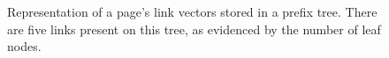 \begin{figure}[tb]
  \centering
  \resizebox{0.8\textwidth}{!}{}
  \caption[A page's link vectors stored in a prefix
    tree.]{Representation of a page's link vectors stored in a prefix
    tree. There are five links present on this tree, as evidenced by
    the number of leaf nodes.} 
\end{figure}
